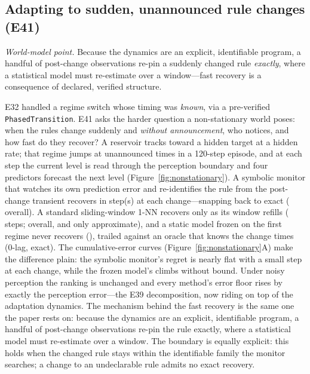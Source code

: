 \documentclass[11pt]{article}
\begin{document}
\subsection{Adapting to sudden, unannounced rule changes (E41)}\label{sec:nonstationary}

\emph{World-model point.} Because the dynamics are an explicit, identifiable program, a handful
of post-change observations re-pin a suddenly changed rule \emph{exactly}, where a statistical
model must re-estimate over a window---fast recovery is a consequence of declared, verified
structure.

E32 handled a regime switch whose timing was \emph{known}, via a pre-verified
\texttt{PhasedTransition}. E41 asks the harder question a non-stationary world
poses: when the rules change suddenly and \emph{without announcement}, who
notices, and how fast do they recover? A reservoir tracks toward a hidden
target at a hidden rate; that regime jumps at \NonStatChanges{} unannounced
times in a 120-step episode, and at each step the current level is read
through the perception boundary and four predictors forecast the next level
(Figure~\ref{fig:nonstationary}). A symbolic monitor that watches its own
prediction error and re-identifies the rule from the post-change transient
recovers in \NonStatSymLag{} step(s) at each change---snapping back to exact
(\NonStatSymAcc{} overall). A standard sliding-window 1-NN recovers only as its
window refills (\NonStatWinLag{} steps; \NonStatWinAcc{} overall, and only
approximate), and a static model frozen on the first regime never recovers
(\NonStatFrozenAcc), trailed against an oracle that knows the change times
(0-lag, exact). The cumulative-error curves (Figure~\ref{fig:nonstationary}A)
make the difference plain: the symbolic monitor's regret is nearly flat with a
small step at each change, while the frozen model's climbs without bound. Under
noisy perception the ranking is unchanged and every method's error floor rises
by exactly the perception error---the E39 decomposition, now riding on top of
the adaptation dynamics. The mechanism behind the fast recovery is the same one
the paper rests on: because the dynamics are an explicit, identifiable program,
a handful of post-change observations re-pin the rule exactly, where a
statistical model must re-estimate over a window. The boundary is equally
explicit: this holds when the changed rule stays within the identifiable family
the monitor searches; a change to an undeclarable rule admits no exact
recovery.
\end{document}
